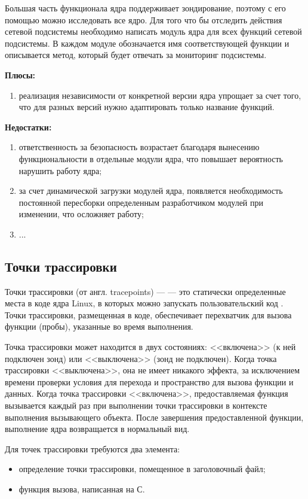 Большая часть функционала ядра поддерживает зондирование, поэтому с его помощью можно исследовать все ядро. Для того что бы отследить действия сетевой подсистемы необходимо написать модуль ядра для всех функций сетевой подсистемы.
В каждом модуле обозначается имя соответствующей функции и описывается метод, который будет отвечать за мониторинг подсистемы.

\textbf{Плюсы:}
\begin{enumerate}
	\item реализация независимости от конкретной версии ядра упрощает за счет того, что для разных версий нужно адаптировать только название функций.
\end{enumerate}

\textbf{Недостатки:}
\begin{enumerate}
	\item ответственность за безопасность возрастает благодаря вынесению функциональности в отдельные модули ядра, что повышает вероятность нарушить работу ядра;
	\item за счет динамической загрузки модулей ядра, появляется необходимость постоянной пересборки определенным разработчиком модулей при изменении, что осложняет работу;
	\item ...
\end{enumerate}

\subsection{Точки трассировки}

Точки трассировки (от англ. tracepoints) --- — это статически определенные места в коде ядра Linux, в которых можно запускать пользовательский код \cite{tracepoint_kernel_linux, declarative_tracepoint}.
Точки трассировки, размещенная в коде, обеспечивает перехватчик для вызова функции (пробы), указанные во время выполнения.

Точка трассировки может находится в двух состояниях: <<включена>> (к ней подключен зонд) или <<выключена>> (зонд не подключен).
Когда точка трассировки <<выключена>>, она не имеет никакого эффекта, за исключением времени проверки условия для перехода и пространство для вызова функции и данных.
Когда точка трассировки  <<включена>>, предоставляемая функция вызывается каждый раз при выполнении точки трассировки в контексте выполнения вызывающего объекта. После завершения предоставленной функции, выполнение ядра возвращается в нормальный вид.

Для точек трассировки требуются два элемента:
\begin{itemize}
	\item определение точки трассировки, помещенное в заголовочный файл;
	\item функция вызова, написанная на С.
\end{itemize}

